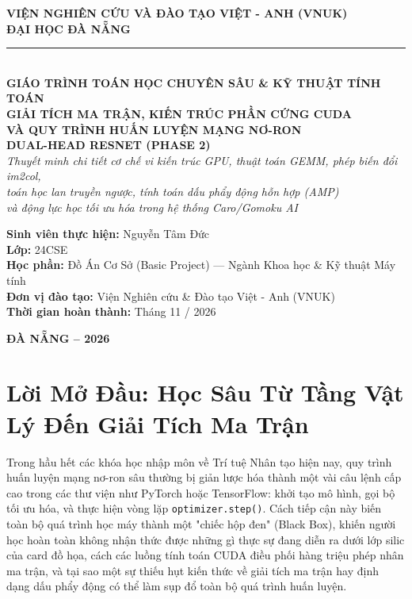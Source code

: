 \documentclass[11pt,a4paper]{report}
\begin{document}
\begin{titlepage}
\begin{center}
    {\large \textbf{VIỆN NGHIÊN CỨU VÀ ĐÀO TẠO VIỆT - ANH (VNUK)}}\\[4pt]
    {\large \textbf{ĐẠI HỌC ĐÀ NẴNG}}\\[8pt]
    \rule{0.6\textwidth}{1.2pt}\\[2.0cm]

    {\large \textbf{GIÁO TRÌNH TOÁN HỌC CHUYÊN SÂU \& KỸ THUẬT TÍNH TOÁN}}\\[10pt]
    {\LARGE \bfseries \color{primary} GIẢI TÍCH MA TRẬN, KIẾN TRÚC PHẦN CỨNG CUDA\\VÀ QUY TRÌNH HUẤN LUYỆN MẠNG NƠ-RON\\DUAL-HEAD RESNET (PHASE 2)}\\[14pt]
    {\large \textit{Thuyết minh chi tiết cơ chế vi kiến trúc GPU, thuật toán GEMM, phép biến đổi im2col,\\toán học lan truyền ngược, tính toán dấu phẩy động hỗn hợp (AMP)\\và động lực học tối ưu hóa trong hệ thống Caro/Gomoku AI}}\\[2.0cm]

    \begin{minipage}{0.85\textwidth}
        \large
        \textbf{Sinh viên thực hiện:} Nguyễn Tâm Đức\\
        \textbf{Lớp:} 24CSE\\
        \textbf{Học phần:} Đồ Án Cơ Sở (Basic Project) --- Ngành Khoa học \& Kỹ thuật Máy tính\\
        \textbf{Đơn vị đào tạo:} Viện Nghiên cứu \& Đào tạo Việt - Anh (VNUK)\\
        \textbf{Thời gian hoàn thành:} Tháng 11 / 2026
    \end{minipage}

    \vfill
    {\large \textbf{ĐÀ NẴNG -- 2026}}
\end{center}
\end{titlepage}

\chapter*{Lời Mở Đầu: Học Sâu Từ Tầng Vật Lý Đến Giải Tích Ma Trận}

Trong hầu hết các khóa học nhập môn về Trí tuệ Nhân tạo hiện nay, quy trình huấn luyện mạng nơ-ron sâu thường bị giản lược hóa thành một vài câu lệnh cấp cao trong các thư viện như PyTorch hoặc TensorFlow: khởi tạo mô hình, gọi bộ tối ưu hóa, và thực hiện vòng lặp \texttt{optimizer.step()}. Cách tiếp cận này biến toàn bộ quá trình học máy thành một "chiếc hộp đen" (Black Box), khiến người học hoàn toàn không nhận thức được những gì thực sự đang diễn ra dưới lớp silic của card đồ họa, cách các luồng tính toán CUDA điều phối hàng triệu phép nhân ma trận, và tại sao một sự thiếu hụt kiến thức về giải tích ma trận hay định dạng dấu phẩy động có thể làm sụp đổ toàn bộ quá trình huấn luyện.
\end{document}
